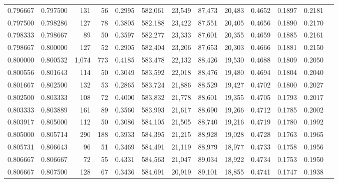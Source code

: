 \begin{tabular}{rrrrrrrrrrrrr}
0.796667 & 0.797500 &   131 &  56 &                                     0.2995 & 582,061 &  23,549 &  87,473 &  20,483 & 0.4652 & 0.1897 & 0.2181 \\
0.797500 & 0.798286 &   127 &  78 &                                     0.3805 & 582,188 &  23,422 &  87,551 &  20,405 & 0.4656 & 0.1890 & 0.2170 \\
0.798333 & 0.798667 &    89 &  50 &                                     0.3597 & 582,277 &  23,333 &  87,601 &  20,355 & 0.4659 & 0.1885 & 0.2161 \\
0.798667 & 0.800000 &   127 &  52 &                                     0.2905 & 582,404 &  23,206 &  87,653 &  20,303 & 0.4666 & 0.1881 & 0.2150 \\
0.800000 & 0.800532 & 1,074 & 773 &                                     0.4185 & 583,478 &  22,132 &  88,426 &  19,530 & 0.4688 & 0.1809 & 0.2050 \\
0.800556 & 0.801643 &   114 &  50 &                                     0.3049 & 583,592 &  22,018 &  88,476 &  19,480 & 0.4694 & 0.1804 & 0.2040 \\
0.801667 & 0.802500 &   132 &  53 &                                     0.2865 & 583,724 &  21,886 &  88,529 &  19,427 & 0.4702 & 0.1800 & 0.2027 \\
0.802500 & 0.803333 &   108 &  72 &                                     0.4000 & 583,832 &  21,778 &  88,601 &  19,355 & 0.4705 & 0.1793 & 0.2017 \\
0.803333 & 0.803889 &   161 &  89 &                                     0.3560 & 583,993 &  21,617 &  88,690 &  19,266 & 0.4712 & 0.1785 & 0.2002 \\
0.803917 & 0.805000 &   112 &  50 &                                     0.3086 & 584,105 &  21,505 &  88,740 &  19,216 & 0.4719 & 0.1780 & 0.1992 \\
0.805000 & 0.805714 &   290 & 188 &                                     0.3933 & 584,395 &  21,215 &  88,928 &  19,028 & 0.4728 & 0.1763 & 0.1965 \\
0.805731 & 0.806643 &    96 &  51 &                                     0.3469 & 584,491 &  21,119 &  88,979 &  18,977 & 0.4733 & 0.1758 & 0.1956 \\
0.806667 & 0.806667 &    72 &  55 &                                     0.4331 & 584,563 &  21,047 &  89,034 &  18,922 & 0.4734 & 0.1753 & 0.1950 \\
0.806667 & 0.807500 &   128 &  67 &                                     0.3436 & 584,691 &  20,919 &  89,101 &  18,855 & 0.4741 & 0.1747 & 0.1938 \\

\end{tabular}
